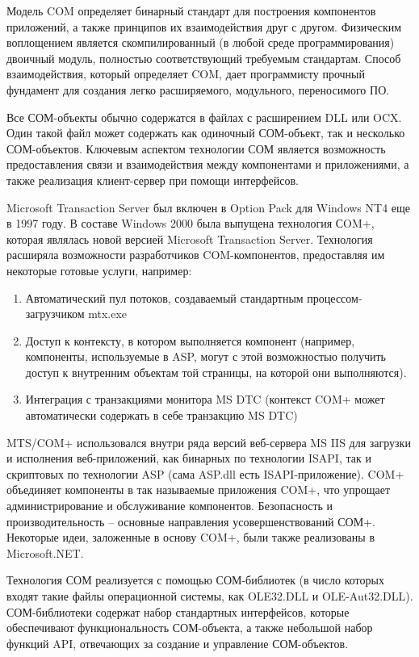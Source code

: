 Модель COM определяет бинарный стандарт для построения компонентов приложений, а также принципов их взаимодействия друг с другом. Физическим воплощением является скомпилированный (в любой среде программирования) двоичный модуль, полностью соответствующий требуемым стандартам. Способ взаимодействия, который определяет COM, дает программисту прочный фундамент для создания легко расширяемого, модульного, переносимого ПО.

Все СОМ-объекты обычно содержатся в файлах с расширением DLL или OCX. Один такой файл может содержать как одиночный СОМ-объект, так и несколько СОМ-объектов. Ключевым аспектом технологии СОМ является возможность предоставления связи и взаимодействия между компонентами и приложениями, а также реализация клиент-сервер при помощи интерфейсов.

Microsoft Transaction Server был включен в Option Pack для Windows NT4 еще в 1997 году. В составе Windows 2000 была выпущена технология СOM+, которая являлась новой версией Microsoft Transaction Server. Технология расширяла возможности разработчиков COM-компонентов, предоставляя им некоторые готовые услуги, например:

\begin{enumerate}
  \item Автоматический пул потоков, создаваемый стандартным процессом-загрузчиком mtx.exe
  \item Доступ к контексту, в котором выполняется компонент (например, компоненты, используемые в ASP, могут с этой возможностью получить доступ к внутренним объектам той страницы, на которой они выполняются).
  \item Интеграция с транзакциями монитора MS DTC (контекст COM+ может автоматически содержать в себе транзакцию MS DTC)
\end{enumerate}

MTS/COM+ использовался внутри ряда версий веб-сервера MS IIS для загрузки и исполнения веб-приложений, как бинарных по технологии ISAPI, так и скриптовых по технологии ASP (сама ASP.dll есть ISAPI-приложение). COM+ объединяет компоненты в так называемые приложения COM+, что упрощает администрирование и обслуживание компонентов. Безопасность и производительность – основные направления усовершенствований СОМ+. Некоторые идеи, заложенные в основу COM+, были также реализованы в Microsoft.NET.

Технология СОМ реализуется с помощью СОМ-библиотек (в число которых входят такие файлы операционной системы, как OLE32.DLL и OLE-Aut32.DLL). СОМ-библиотеки содержат набор стандартных интерфейсов, которые обеспечивают функциональность СОМ-объекта, а также небольшой набор функций API, отвечающих за создание и управление СОМ-объектов.

